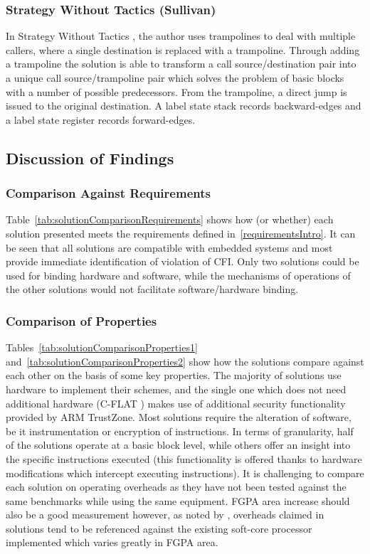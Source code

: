 \subsubsection*{Strategy Without Tactics (Sullivan)}
In Strategy Without Tactics \cite{Davi2015}, the author uses trampolines to deal with multiple callers, where a single destination is replaced with a trampoline. Through adding a trampoline the solution is able to transform a call source\slash destination pair into a unique call source\slash trampoline pair which solves the problem of basic blocks with a number of possible predecessors. From the trampoline, a direct jump is issued to the original destination. A label state stack records backward-edges and a label state register records forward-edges. 

\subsection{Discussion of Findings}
\subsubsection*{Comparison Against Requirements}

Table~\ref{tab:solutionComparisonRequirements} shows how (or whether) each solution presented meets the requirements defined in~\ref{requirementsIntro}. It can be seen that all solutions are compatible with embedded systems and most provide immediate identification of violation of CFI. Only two solutions could be used for binding hardware and software, while the mechanisms of operations of the other solutions would not facilitate software\slash hardware binding.

\subsubsection*{Comparison of Properties}


Tables~\ref{tab:solutionComparisonProperties1} and~\ref{tab:solutionComparisonProperties2} show how the solutions compare against each other on the basis of some key properties. The majority of solutions use hardware to implement their schemes, and the single one which does not need additional hardware (C-FLAT \cite{Abera2016}) makes use of additional security functionality provided by ARM TrustZone. Most solutions require the alteration of software, be it instrumentation or encryption of instructions. In terms of granularity, half of the solutions operate at a basic block level, while others offer an insight into the specific instructions executed (this functionality is offered thanks to hardware modifications which intercept executing instructions). It is challenging to compare each solution on operating overheads as they have not been tested against the same benchmarks while using the same equipment. FGPA area increase should also be a good measurement however, as noted by \cite{DeClercq2017}, overheads claimed in solutions tend to be referenced against the existing soft-core processor implemented which varies greatly in FGPA area.


